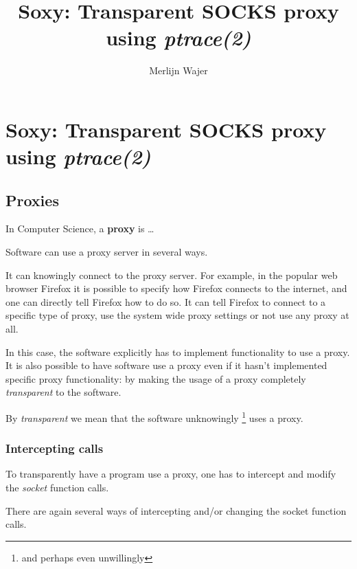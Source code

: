 \documentclass[a4paper]{article}
\author{Merlijn Wajer}
\title{Soxy: Transparent SOCKS proxy using \textit{ptrace(2)}}
\begin{document}
\maketitle

\section{Soxy: Transparent SOCKS proxy using \textit{ptrace(2)}}

%

\subsection{Proxies}
In Computer Science, a \textbf{proxy} is …


Software can use a proxy server in several ways.

It can knowingly connect to the proxy server. For example, in the popular web
browser Firefox it is possible to specify how Firefox connects to the internet,
and one can directly tell Firefox how to do so. It can tell Firefox to connect
to a specific type of proxy, use the system wide proxy settings or not use any
proxy at all.

In this case, the software explicitly has to implement functionality to use a
proxy. It is also possible to have software use a proxy even if it hasn't
implemented specific proxy functionality: by making the usage of a proxy
completely \textit{transparent} to the software.

By \textit{transparent} we mean that the software unknowingly
\footnote{and perhaps even unwillingly} uses a proxy.

\subsubsection{Intercepting calls}

To transparently have a program use a proxy, one has to intercept and modify
the \textit{socket} function calls.

There are again several ways of intercepting and/or changing the socket function
calls.
\end{document}
